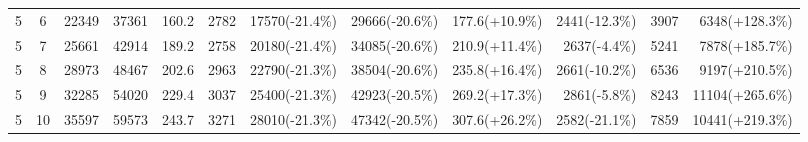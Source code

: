 \documentclass{article}
\begin{document}
\begin{table}[t]
{\begin{tabular}{cc
                r r r r
                r r r r r r}
5 & 6  & 22349 & 37361 & 160.2 & 2782 &
17570(-21.4\%) & 29666(-20.6\%) & 177.6(+10.9\%) & 2441(-12.3\%) & 3907 & 6348(+128.3\%) \\

5 & 7  & 25661 & 42914 & 189.2 & 2758 &
20180(-21.4\%) & 34085(-20.6\%) & 210.9(+11.4\%) & 2637(-4.4\%) & 5241 & 7878(+185.7\%) \\

5 & 8  & 28973 & 48467 & 202.6 & 2963 &
22790(-21.3\%) & 38504(-20.6\%) & 235.8(+16.4\%) & 2661(-10.2\%) & 6536 & 9197(+210.5\%) \\

5 & 9  & 32285 & 54020 & 229.4 & 3037 &
25400(-21.3\%) & 42923(-20.5\%) & 269.2(+17.3\%) & 2861(-5.8\%) & 8243 & 11104(+265.6\%) \\

5 & 10 & 35597 & 59573 & 243.7 & 3271 &
28010(-21.3\%) & 47342(-20.5\%) & 307.6(+26.2\%) & 2582(-21.1\%) & 7859 & 10441(+219.3\%) \\

\bottomrule
\end{tabular}
}
\end{table}


\begin{table}[t]
\centering
\caption{自動倉庫：最小化なし／最小化ありの計算資源と削減率}
\end{table}
\end{document}
